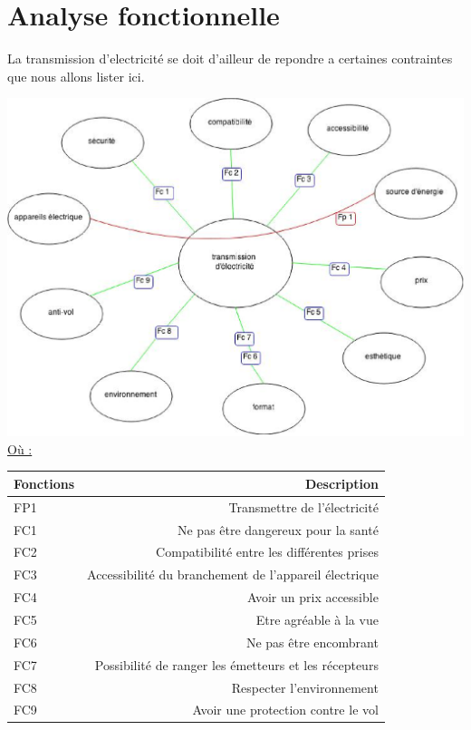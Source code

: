 \documentclass[12pt]{report}
\begin{document}
\section{Analyse fonctionnelle}
  La transmission d'electricité se doit d'ailleur de repondre a certaines contraintes que nous allons lister ici.
\begin{center}
  \includegraphics[width=1\textwidth]{pieuvre}
  \underline{Où :} \\
  \begin{tabular}{| l || r |}
  
    \hline
    Fonctions & Description \\
    \hline
    FP1 & Transmettre de l’électricité \\
    FC1 & Ne pas être dangereux pour la santé \\
    FC2 & Compatibilité entre les différentes prises \\
    FC3 & Accessibilité du branchement de l’appareil électrique \\
    FC4 & Avoir un prix accessible \\
    FC5 & Etre agréable à la vue \\
    FC6 & Ne pas être encombrant \\
    FC7 & Possibilité de ranger les émetteurs et les récepteurs \\
    FC8 & Respecter l’environnement \\
    FC9 & Avoir une protection contre le vol \\
    \hline
    
  \end{tabular}
\end{center}
\end{document}
